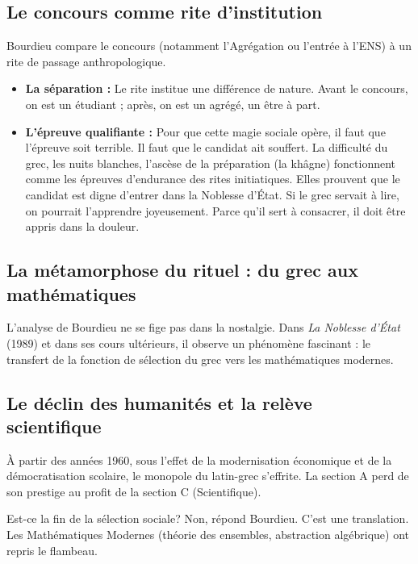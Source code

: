 \subsection{Le concours comme rite d'institution}

Bourdieu compare le concours (notamment l'Agrégation ou l'entrée à l'ENS) à un rite de passage
anthropologique.\cite{I-2-3-ref28}

\begin{itemize}\item \textbf{La séparation :} Le rite institue une différence de nature. Avant le concours, on est un étudiant ; après, on est un \og agrégé\fg{}, un être à part.\item \textbf{L'épreuve qualifiante :} Pour que cette magie sociale opère, il faut que l'épreuve soit terrible. Il faut que le candidat ait souffert. La difficulté du grec, les nuits blanches, l'ascèse de la préparation (la \og khâgne\fg{}) fonctionnent comme les épreuves d'endurance des rites initiatiques. Elles prouvent que le candidat est digne d'entrer dans la \og Noblesse d'État\fg{}. Si le grec servait à lire, on pourrait l'apprendre joyeusement. Parce qu'il sert à consacrer, il doit être appris dans la douleur.\cite{I-2-3-ref30}\end{itemize}

\subsection{La métamorphose du rituel : du grec aux mathématiques}

L'analyse de Bourdieu ne se fige pas dans la nostalgie. Dans \textit{La Noblesse d'État} (1989) et
dans ses cours ultérieurs, il observe un phénomène fascinant : le transfert de la fonction de
sélection du grec vers les mathématiques modernes.



\subsection{Le déclin des humanités et la relève scientifique}

À partir des années 1960, sous l'effet de la modernisation économique et de la démocratisation
scolaire, le monopole du latin-grec s'effrite. La section A perd de son prestige au profit de la
section C (Scientifique).\cite{I-2-3-ref6}

Est-ce la fin de la sélection sociale? Non, répond Bourdieu. C'est une translation. Les \og
Mathématiques Modernes\fg{} (théorie des ensembles, abstraction algébrique) ont repris le flambeau.



